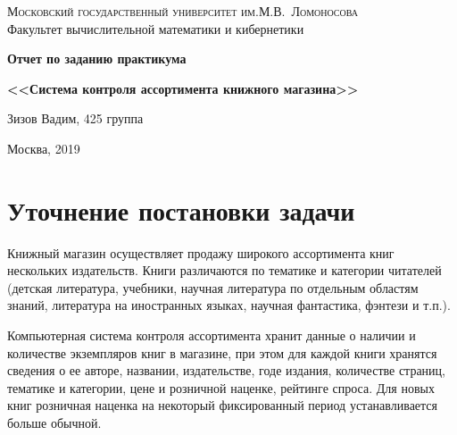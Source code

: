 \documentclass[final,12pt]{article}
\begin{document}
\thispagestyle{empty}

\begin{center}

{\scshape Московский государственный университет им.М.В.~Ломоносова}\\
Факультет вычислительной математики и кибернетики\\


\vspace{7cm}

\textbf{{\Large Отчет по заданию практикума}}

\vspace{1cm}

{\Huge\bfseries
<<Система контроля ассортимента книжного магазина>>}
\end{center}

\vspace{3cm}

\begin{flushright}
 
 \vspace{2cm} 

{{\normalsize Зизов Вадим, 425 группа }}
\end{flushright}
  
  \vspace{5cm}
  
\begin{center}
Москва, 2019
\end{center}

\enlargethispage{4\baselineskip}

\newpage

\tableofcontents

\newpage

\section{Уточнение постановки задачи}

Книжный магазин осуществляет продажу широкого ассортимента книг нескольких издательств. Книги различаются по тематике и категории читателей (детская литература, учебники, научная литература по отдельным областям знаний, литература на иностранных языках, научная фантастика, фэнтези и т.п.).

Компьютерная система контроля ассортимента хранит данные о наличии и количестве экземпляров книг в магазине, при этом для каждой книги хранятся сведения о ее авторе, названии, издательстве, годе издания, количестве страниц, тематике и категории, цене и розничной наценке, рейтинге спроса. Для новых книг розничная наценка на некоторый фиксированный период устанавливается больше обычной. 
\end{document}
